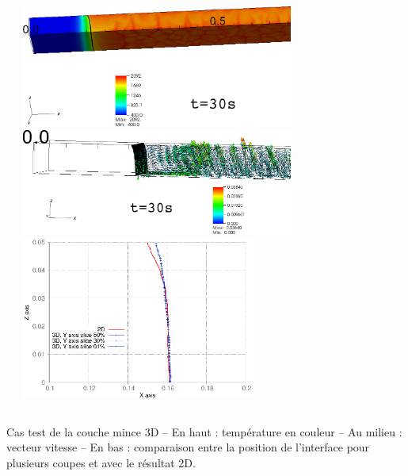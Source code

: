\documentclass{beamer}
\begin{document}
\begin{frame}
\begin{columns}[c]
\begin{column}{0.5 \textwidth}
\begin{center}
\end{center}
\end{column}
    \begin{column}{0.5 \textwidth}
\begin{center}
\includegraphics[width=0.7\textwidth]{./Figures/CoucheMinceTEMP0300001.png}\\
\hspace{-0.8cm}
\includegraphics[width=0.7\textwidth]{./Figures/CoucheMinceVIT0300000.png}\\
\includegraphics[width=0.6\textwidth]{./Figures/Yslice_30s.eps}


\end{center}
   \end{column}
   \end{columns}
\center Cas test de la couche mince 3D -- En haut : température en couleur -- Au milieu : vecteur vitesse  -- En bas : comparaison entre la position de l'interface pour plusieurs coupes et avec le résultat 2D.


\end{frame}


\end{document}
